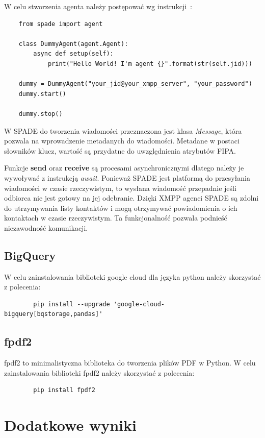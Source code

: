 \documentclass[11pt]{report}
\begin{document}
    W celu stworzenia agenta należy postępować wg instrukcji~\cite{SPADEquickstart}:
    \begin{verbatim}
    from spade import agent

    class DummyAgent(agent.Agent):
        async def setup(self):
            print("Hello World! I'm agent {}".format(str(self.jid)))

    dummy = DummyAgent("your_jid@your_xmpp_server", "your_password")
    dummy.start()

    dummy.stop()
    \end{verbatim}

    W SPADE do tworzenia wiadomości przeznaczona jest klasa \textit{Message},
    która pozwala na wprowadzenie metadanych do wiadomości.
    Metadane w postaci słowników klucz, wartość są przydatne do uwzględnienia atrybutów FIPA\@.

    Funkcje \textbf{send} oraz \textbf{receive} są procesami asynchronicznymi dlatego należy je wywoływać z instrukcją \textit{await}.
    Ponieważ SPADE jest platformą do przesyłania wiadomości w czasie rzeczywistym,
    to wysłana wiadomość przepadnie jeśli odbiorca nie jest gotowy na jej odebranie.
    Dzięki XMPP agenci SPADE są zdolni do utrzymywania listy kontaktów i mogą otrzymywać powiadomienia o ich kontaktach w czasie rzeczywistym.
    Ta funkcjonalność pozwala podnieść niezawodność komunikacji.


    \section{BigQuery}
    W celu zainstalowania biblioteki google cloud dla języka python należy skorzystać z polecenia:
    \begin{verbatim}
        pip install --upgrade 'google-cloud-bigquery[bqstorage,pandas]'
    \end{verbatim}


    \section{fpdf2}
    fpdf2 to minimalistyczna biblioteka do tworzenia plików PDF w Python.
    W celu zainstalowania biblioteki fpdf2 należy skorzystać z polecenia:
    \begin{verbatim}
        pip install fpdf2
    \end{verbatim}


    \chapter{Dodatkowe wyniki}
\end{document}
